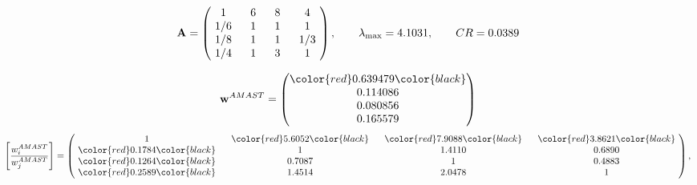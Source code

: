 \begin{example}
\begin{equation*}
\mathbf{A} =
\begin{pmatrix}
$\,\,$ 1 $\,\,$ & $\,\,$6$\,\,$ & $\,\,$8$\,\,$ & $\,\,$4 $\,\,$ \\
$\,\,$ 1/6$\,\,$ & $\,\,$ 1 $\,\,$ & $\,\,$1$\,\,$ & $\,\,$1 $\,\,$ \\
$\,\,$ 1/8$\,\,$ & $\,\,$ 1 $\,\,$ & $\,\,$ 1 $\,\,$ & $\,\,$ 1/3 $\,\,$ \\
$\,\,$ 1/4$\,\,$ & $\,\,$ 1 $\,\,$ & $\,\,$3$\,\,$ & $\,\,$ 1  $\,\,$ \\
\end{pmatrix},
\qquad
\lambda_{\max} =
4.1031,
\qquad
CR = 0.0389
\end{equation*}

\begin{equation*}
\mathbf{w}^{AMAST} =
\begin{pmatrix}
\color{red} 0.639479\color{black} \\
0.114086\\
0.080856\\
0.165579
\end{pmatrix}\end{equation*}
\begin{equation*}
\left[ \frac{{w}^{AMAST}_i}{{w}^{AMAST}_j} \right] =
\begin{pmatrix}
$\,\,$ 1 $\,\,$ & $\,\,$\color{red} 5.6052\color{black} $\,\,$ & $\,\,$\color{red} 7.9088\color{black} $\,\,$ & $\,\,$\color{red} 3.8621\color{black} $\,\,$ \\
$\,\,$\color{red} 0.1784\color{black} $\,\,$ & $\,\,$ 1 $\,\,$ & $\,\,$1.4110$\,\,$ & $\,\,$0.6890  $\,\,$ \\
$\,\,$\color{red} 0.1264\color{black} $\,\,$ & $\,\,$0.7087$\,\,$ & $\,\,$ 1 $\,\,$ & $\,\,$0.4883 $\,\,$ \\
$\,\,$\color{red} 0.2589\color{black} $\,\,$ & $\,\,$1.4514$\,\,$ & $\,\,$2.0478$\,\,$ & $\,\,$ 1  $\,\,$ \\
\end{pmatrix},
\end{equation*}


\end{example}
